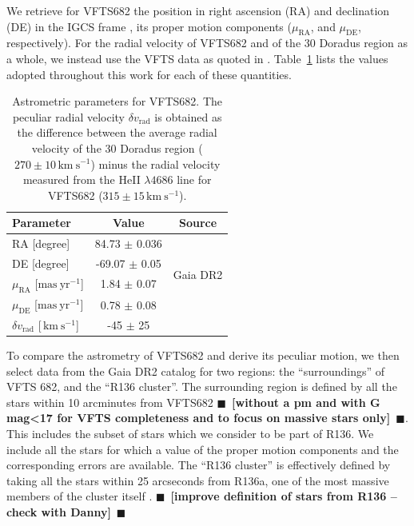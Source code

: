 \documentclass{aa}
\newcommand{\todo}[1]{{\large $\blacksquare$~\textbf{\color{red}[#1]}}~$\blacksquare$}
\newcommand{\kms}{{\,\mathrm{km\ s^{-1}}}}
\DeclareRobustCommand{\Tabref}[1]{Table~\ref{#1}}
\begin{document}
We retrieve for VFTS682 the position in right ascension (RA) and declination (DE)
in the IGCS frame \cite[][]{brown:18}, its
proper motion components ($\mu_\mathrm{RA}$, and $\mu_\mathrm{DE}$,
respectively). For the radial velocity of VFTS682 and of the 30 Doradus
region as a whole, we instead use the VFTS data
as quoted in \cite{bestenlehner:11}. \Tabref{tab:vfts682} lists the values adopted throughout
this work for each of these quantities.

\begin{table}[tbp]
  \centering
    \caption{Astrometric parameters for VFTS682. The peculiar radial
    velocity $\delta v_\mathrm{rad}$ is obtained as the difference
    between the average radial velocity of the 30 Doradus region
    ($270\pm10\kms$) minus the radial velocity measured from the HeII $\lambda4686$
    line for VFTS682 ($315\pm15\kms$).}

  \begin{tabular}[htbp]{l|c|c}
    Parameter & Value & Source\\ \hline\hline
    RA \hfill[degree] &  84.73 $\pm$  0.036 & \multirow{4}{*}{Gaia DR2}\\
    DE \hfill [degree] & -69.07 $\pm$  0.05  & \\
    $\mu_\mathrm{RA}$  \hfill[$\mathrm{mas\ yr^{-1}}$] & 1.84 $\pm$ 0.07 & \\
    $\mu_\mathrm{DE}$  \hfill[$\mathrm{mas\ yr^{-1}}$] & 0.78 $\pm$ 0.08& \\
    $\delta v_\mathrm{rad}$  \hfill[$\kms$] & -45 $\pm$ 25 & \cite{bestenlehner:11}\\
    \hline
  \end{tabular}
  \label{tab:vfts682}
\end{table}

To compare the astrometry of VFTS682 and derive its peculiar motion,
we then select data from the Gaia DR2 catalog for two regions: the
``surroundings'' of VFTS 682, and the ``R136 cluster''. The
surrounding region is defined by all the stars within 10 arcminutes from
VFTS682 \todo{without a pm and with G mag<17 for VFTS completeness and
to focus on massive stars only}. This includes the subset of stars which we consider to be
part of R136. We include all the stars for which a value of the proper
motion components and the corresponding errors are available.
The ``R136 cluster'' is effectively defined by taking all the stars
within 25 arcseconds from R136a, one of the most massive members of
the cluster itself \citep[][]{crowther:10}. \todo{improve definition
  of stars from R136 -- check with Danny}
\end{document}
